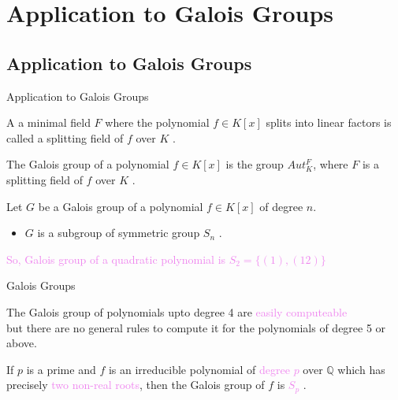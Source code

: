 \documentclass{beamer}
\begin{document}
\section{Application to Galois Groups}

\subsection{Application to Galois Groups}
\begin{frame}{Application to Galois Groups}

    A a minimal field \(F\) where the polynomial \(f \in K[x]\) splits into linear factors is called a \textcolor{green!50!black}{splitting field} of \(f\) over \(K\) \cite{hunger}.
  \vspace{3mm}

  \begin{definition}
    The Galois group of a polynomial \(f \in K[x]\) is the group \(Aut_K^F\), where \(F\) is a splitting field of \(f\) over \(K\) \cite{hunger}.
  \end{definition}

\vspace{2mm}
  \begin{tcolorbox}[colback=white, colframe=blue!40, boxsep=2mm]
    \begin{theorem}
      Let \(G\) be a Galois group of a polynomial \(f \in K[x]\) of degree \(n\).
      \begin{itemize}
      \item \(G\) is  a subgroup of symmetric group \(S_n\) \cite{hunger}.
      \end{itemize}
    \end{theorem}
  \end{tcolorbox}
  \vspace{3mm}
\textcolor{violet}{So, Galois group of a quadratic polynomial is \(S_2=\{(1),(12)\}\)}
\end{frame}


\begin{frame}{Galois Groups}

  The Galois group of polynomials upto degree 4 are \textcolor{violet}{easily computeable}\\
  but there are no general rules to compute it for the polynomials of degree 5 or above.
  \vspace{10mm}

  \begin{tcolorbox}[colback=white, colframe=blue!40, boxsep=2mm]
\begin{theorem}[Theorem]
If \(p\) is a prime and \(f\) is an irreducible polynomial of \textcolor{violet}{degree \(p\)} over \(\mathbb{Q}\) which has precisely \textcolor{violet}{two non-real roots}, then the Galois group of \(f\) is \textcolor{violet}{\(S_p\)} \cite{hunger}.
\end{theorem}
\end{tcolorbox}
\end{frame}
\end{document}
